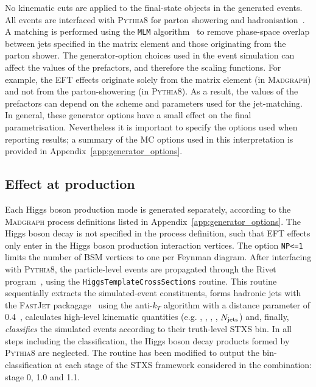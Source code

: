 No kinematic cuts are applied to the final-state objects in the generated events. All events are interfaced with \textsc{Pythia8} for parton showering and hadronisation~\cite{Sjostrand:2014zea}. A matching is performed using the \texttt{MLM} algorithm~\cite{Alwall:2007fs} to remove phase-space overlap between jets specified in the matrix element and those originating from the parton shower. The generator-option choices used in the event simulation can affect the values of the prefactors, and therefore the scaling functions. For example, the EFT effects originate solely from the matrix element (in \textsc{Madgraph}) and not from the parton-showering (in \textsc{Pythia8}). As a result, the values of the prefactors can depend on the scheme and parameters used for the jet-matching. In general, these generator options have a small effect on the final parametrisation. Nevertheless it is important to specify the options used when reporting results; a summary of the MC options used in this interpretation is provided in Appendix~\ref{app:generator_options}.

\subsection{Effect at production}
Each Higgs boson production mode is generated separately, according to the \textsc{Madgraph} process definitions listed in Appendix~\ref{app:generator_options}. The Higgs boson decay is not specified in the process definition, such that EFT effects only enter in the Higgs boson production interaction vertices. The option \texttt{NP<=1} limits the number of BSM vertices to one per Feynman diagram. After interfacing with \textsc{Pythia8}, the particle-level events are propagated through the Rivet program~\cite{Buckley:2010ar}, using the \texttt{HiggsTemplateCrossSections} routine. This routine sequentially extracts the simulated-event constituents, forms hadronic jets with the \textsc{FastJet} packagage~\cite{Cacciari:2011ma} using the anti-$k_T$ algorithm with a distance parameter of 0.4~\cite{Cacciari:2008gp}, calculates high-level kinematic quantities (e.g. \ptH, \ptV, \ptHjj, \mjj, $N_{\rm{jets}}$) and, finally, \textit{classifies} the simulated events according to their truth-level STXS bin. In all steps including the classification, the Higgs boson decay products formed by \textsc{Pythia8} are neglected. The routine has been modified to output the bin-classification at each stage of the STXS framework considered in the combination: stage 0, 1.0 and 1.1.

